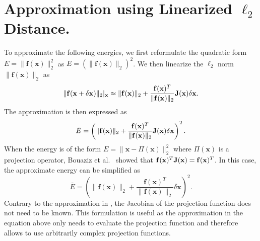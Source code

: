 \section{Approximation using Linearized $\ell_2$ Distance.}
\label{app:lindistance}
To approximate the following energies, we first reformulate the quadratic form $E = \|\mathbf{f}(\mathbf{x})\|_2^2$ as $E = (\|\mathbf{f}(\mathbf{x})\|_2)^2$. We then linearize the $\ell_2$ norm $\|\mathbf{f}(\mathbf{x})\|_2$ as
\begin{equation*}
\|\mathbf{f}(\mathbf{x}+\delta\mathbf{x})\|_2|_{\mathbf{x}} \approx \|\mathbf{f}(\mathbf{x})\|_2 + \frac{\mathbf{f}(\mathbf{x})^T}{\|\mathbf{f}(\mathbf{x})\|_2}\mathbf{J}(\mathbf{x})\delta\mathbf{x}.
\end{equation*}
The approximation is then expressed as 
\begin{equation*}
\bar{E} = \left( \|\mathbf{f}(\mathbf{x})\|_2 + \frac{\mathbf{f}(\mathbf{x})^T}{\|\mathbf{f}(\mathbf{x})\|_2}\mathbf{J}(\mathbf{x})\delta\mathbf{x} \right)^2.
\end{equation*}
When the energy is of the form $E = \|\mathbf{x} - \Pi(\mathbf{x})\|_2^2$ where $\Pi(\mathbf{x})$ is a projection operator, Bouaziz et al.~\cite{Bouaziz_sgp12} showed that $\mathbf{f}(\mathbf{x})^T\mathbf{J}(\mathbf{x}) = \mathbf{f}(\mathbf{x})^T$. In this case, the approximate energy can be simplified as 
\begin{equation*}
\label{eq:linproj}
\bar{E} = \left( \|\mathbf{f}(\mathbf{x})\|_2 + \frac{\mathbf{f}(\mathbf{x})^T}{\|\mathbf{f}(\mathbf{x})\|_2}\delta\mathbf{x} \right)^2.
\end{equation*}
Contrary to the approximation in , the Jacobian of the projection function does not need to be known. This formulation is useful as the approximation in the equation above 
only needs to evaluate the projection function and therefore allows to use arbitrarily complex projection functions.
% 
